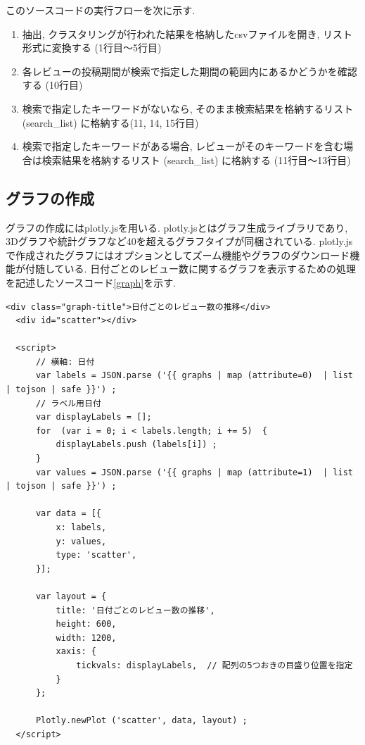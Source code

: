 このソースコードの実行フローを次に示す. 

\begin{enumerate}
  \item 抽出, クラスタリングが行われた結果を格納したcsvファイルを開き, リスト形式に変換する (1行目〜5行目)
  \item 各レビューの投稿期間が検索で指定した期間の範囲内にあるかどうかを確認する (10行目)
  \item 検索で指定したキーワードがないなら, そのまま検索結果を格納するリスト (search\_list) に格納する(11, 14, 15行目)
  \item 検索で指定したキーワードがある場合, レビューがそのキーワードを含む場合は検索結果を格納するリスト (search\_list) に格納する (11行目〜13行目)
\end{enumerate}

\subsection{グラフの作成}\label{creategraph}
グラフの作成にはplotly.jsを用いる. plotly.jsとはグラフ生成ライブラリであり, 3Dグラフや統計グラフなど40を超えるグラフタイプが同梱されている\cite{plotly}.
plotly.jsで作成されたグラフにはオプションとしてズーム機能やグラフのダウンロード機能が付随している. 
日付ごとのレビュー数に関するグラフを表示するための処理を記述したソースコード\ref{graph}を示す. 

\begin{lstlisting}[caption=日付ごとのレビュー数の推移, label=graph]
  <div class="graph-title">日付ごとのレビュー数の推移</div>
  <div id="scatter"></div>

  <script>
      // 横軸: 日付
      var labels = JSON.parse ('{{ graphs | map (attribute=0)  | list | tojson | safe }}') ;
      // ラベル用日付
      var displayLabels = [];
      for  (var i = 0; i < labels.length; i += 5)  {
          displayLabels.push (labels[i]) ;
      }
      var values = JSON.parse ('{{ graphs | map (attribute=1)  | list | tojson | safe }}') ;

      var data = [{
          x: labels,
          y: values,
          type: 'scatter',
      }];

      var layout = {
          title: '日付ごとのレビュー数の推移',
          height: 600,
          width: 1200,
          xaxis: {
              tickvals: displayLabels,  // 配列の5つおきの目盛り位置を指定
          }
      };

      Plotly.newPlot ('scatter', data, layout) ;
  </script>
\end{lstlisting}


